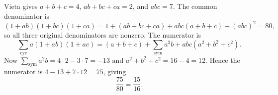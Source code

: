 Vieta gives $a+b+c=4$, $ab+bc+ca=2$, and $abc=7$. The common denominator is
\[
(1+ab)(1+bc)(1+ca)
=1+(ab+bc+ca)+abc(a+b+c)+(abc)^2=80,
\]
so all three original denominators are nonzero. The numerator is
\[
\sum_{\mathrm{cyc}}a(1+ab)(1+ac)
=(a+b+c)+\sum_{\mathrm{sym}}a^2b+abc(a^2+b^2+c^2).
\]
Now $\sum_{\mathrm{sym}}a^2b=4\cdot2-3\cdot7=-13$ and $a^2+b^2+c^2=16-4=12$. Hence the numerator is $4-13+7\cdot12=75$, giving
\[
\boxed{\dfrac{75}{80}=\dfrac{15}{16}}.
\]
